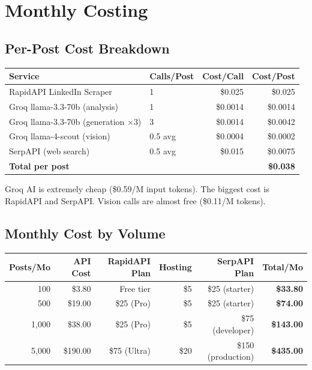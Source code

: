 \documentclass[12pt,a4paper]{article}
\begin{document}
\newpage
\section{Monthly Costing}

\subsection{Per-Post Cost Breakdown}

\begin{center}
\begin{tabularx}{\textwidth}{Xlrr}
\toprule
\textbf{Service} & \textbf{Calls/Post} & \textbf{Cost/Call} & \textbf{Cost/Post} \\
\midrule
RapidAPI LinkedIn Scraper & 1 & \$0.025 & \$0.025 \\
Groq llama-3.3-70b (analysis) & 1 & \$0.0014 & \$0.0014 \\
Groq llama-3.3-70b (generation $\times$3) & 3 & \$0.0014 & \$0.0042 \\
Groq llama-4-scout (vision) & 0.5 avg & \$0.0004 & \$0.0002 \\
SerpAPI (web search) & 0.5 avg & \$0.015 & \$0.0075 \\
\midrule
\textbf{Total per post} & & & \textbf{\$0.038} \\
\bottomrule
\end{tabularx}
\end{center}

\begin{infobox}
Groq AI is extremely cheap (\$0.59/M input tokens). The biggest cost is RapidAPI and SerpAPI. Vision calls are almost free (\$0.11/M tokens).
\end{infobox}

\subsection{Monthly Cost by Volume}

\begin{center}
\begin{tabular}{rrrrrr}
\toprule
\textbf{Posts/Mo} & \textbf{API Cost} & \textbf{RapidAPI Plan} & \textbf{Hosting} & \textbf{SerpAPI Plan} & \textbf{Total/Mo} \\
\midrule
100 & \$3.80 & Free tier & \$5 & \$25 (starter) & \textbf{\$33.80} \\
500 & \$19.00 & \$25 (Pro) & \$5 & \$25 (starter) & \textbf{\$74.00} \\
1,000 & \$38.00 & \$25 (Pro) & \$5 & \$75 (developer) & \textbf{\$143.00} \\
5,000 & \$190.00 & \$75 (Ultra) & \$20 & \$150 (production) & \textbf{\$435.00} \\
\bottomrule
\end{tabular}
\end{center}
\end{document}
